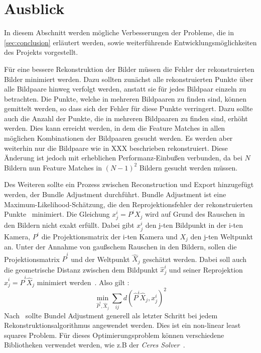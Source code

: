 \chapter{Ausblick}
\label{sec:outlook}

In diesem Abschnitt werden mögliche Verbesserungen der Probleme, die in \cref{sec:conclusion} erläutert werden, sowie weiterführende Entwicklungsmöglichkeiten des Projekts vorgestellt.

Für eine bessere Rekonstruktion der Bilder müssen die Fehler der rekonstruierten Bilder minimiert werden.
Dazu sollten zunächst alle rekonstruierten Punkte über alle Bildpaare hinweg verfolgt werden, anstatt sie für jedes Bildpaar einzeln zu betrachten.
Die Punkte, welche in mehreren Bildpaaren zu finden sind, können gemittelt werden, so dass sich der Fehler für diese Punkte verringert.
Dazu sollte auch die Anzahl der Punkte, die in mehreren Bildpaaren zu finden sind, erhöht werden.
Dies kann erreicht werden, in dem die Feature Matches in allen möglichen Kombinationen der Bildpaaren gesucht werden.
Es werden aber weiterhin nur die Bildpaare wie in XXX beschrieben rekonstruiert.
Diese Änderung ist jedoch mit erheblichen Performanz-Einbußen verbunden, da bei $N$ Bildern nun Feature Matches in $(N-1)^2$ Bildern gesucht werden müssen. 

Des Weiteren sollte ein Prozess zwischen Reconstruction und Export hinzugefügt werden, der Bundle Adjustment durchführt. 
Bundle Adjustment ist eine Maximum-Likelihood-Schätzung, die den Reprojektionsfehler der rekonstruierten Punkte~\cite[Kapitel 18.1]{hartley_2003} minimiert.
Die Gleichung $x^i_j = P^iX_j$ wird auf Grund des Rauschen in den Bildern nicht exakt erfüllt.
Dabei gibt $x^i_j$ den j-ten Bildpunkt in der i-ten Kamera, $P^i$ die Projektionsmatrix der i-ten Kamera und $X_j$ den j-ten Weltpunkt an.
Unter der Annahme von gaußschem Rauschen in den Bildern, sollen die Projektionsmatrix $\hat{P}^i$ und der Weltpunkt $\hat{X}_j$ geschätzt werden.
Dabei soll auch die geometrische Distanz zwischen dem Bildpunkt $\hat{x}^i_j$ und seiner Reprojektion $\hat{x}^i_j = \hat{P}^i\hat{X}_j$ minimiert werden~\cite[Kapitel 18.1]{hartley_2003}.
Also gilt \cite[Equation 18.1]{hartley_2003}:
\[\min_{\hat{P}^i,\hat{X}_j}\sum_{ij}d(\hat{P}^i\hat{X}_j,x^i_j)^2\]
Nach~\cite[Kapitel 18.1]{hartley_2003} sollte Bundel Adjustment generell als letzter Schritt bei jedem Rekonstruktionsalgorithmus angewendet werden.
Dies ist ein non-linear least squares Problem. %
Für dieses Optimierungsproblem können verschiedene Bibliotheken verwendet werden, wie z.B der \emph{Ceres Solver}~\cite{ceres-solver}.
 
